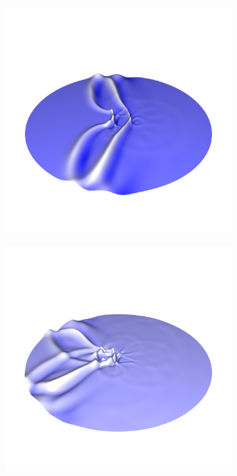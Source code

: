 \documentclass[crop=false,10pt,ngerman]{standalone}
\begin{document}
\begin{figure}[p]
        \begin{subfigure}[b]{0.24\textwidth}
          \center
          \includegraphics[trim={1.5cm 3.05cm 1.5cm 5.2cm},clip,width=0.95\textwidth]{images/circle_wave_4.png}
          \caption{}
        \end{subfigure}
        \begin{subfigure}[b]{0.24\textwidth}
          \center
          \includegraphics[trim={1.5cm 3.05cm 1.5cm 5.2cm},clip,width=0.95\textwidth]{images/circle_wave_5.png}

\end{subfigure}
\end{figure}
\end{document}
